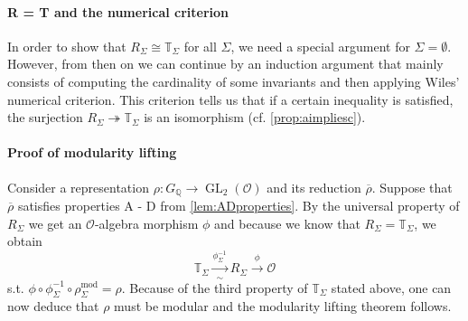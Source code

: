 \documentclass{article}
\theoremstyle{plain}%
\theoremstyle{definition}
\theoremstyle{remark}
\newcommand{\GL}{\operatorname{GL}}
\begin{document}
\paragraph{R = T and the numerical criterion}
In order to show that \(R_\Sigma \cong \mathbb{T}_\Sigma\) for all \(\Sigma\), we need a special argument for
\(\Sigma = \emptyset\). However, from then on we can continue by an induction argument that mainly consists of 
computing the cardinality of some invariants and then applying Wiles' numerical criterion.
This criterion tells us that if a certain inequality is satisfied, the surjection 
\(R_\Sigma \twoheadrightarrow \mathbb{T}_\Sigma\) is an isomorphism (cf. \cref{prop:aimpliesc}).

\paragraph{Proof of modularity lifting}
Consider a representation \(\rho \colon G_\mathbb{Q} \to \GL_2(\mathcal{O})\) and its reduction \(\overline{\rho}\).
Suppose that \(\overline{\rho}\) satisfies properties A - D from \cref{lem:ADproperties}.
By the universal property of \(R_\Sigma\) we get an \(\mathcal{O}\)-algebra morphism \(\phi\) and 
because we know that \(R_\Sigma = \mathbb{T}_\Sigma\), we obtain
\[
    \mathbb{T}_\Sigma \xrightarrow[\sim]{\phi_\Sigma^{-1}} R_\Sigma \xrightarrow{\phi} \mathcal{O}  
\]
s.t. \(\phi \circ \phi_\Sigma^{-1} \circ \rho_\Sigma^\mathrm{mod} = \rho\).
Because of the third property of \(\mathbb{T}_\Sigma\) stated above,
one can now deduce that \(\rho\) must be modular and the modularity lifting theorem follows.
\end{document}
